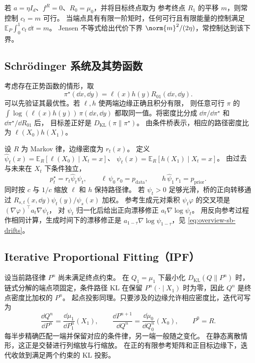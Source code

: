 \begin{example}
若 \(a=\eta I_d\)、\(f^R=0\)、\(R_0=\mu_0\)，并将目标终点取为
参考终点 \(R_1\) 的平移 \(m\)，则常控制 \(c_t=m\) 可行。
当端点具有有限一阶矩时，任何可行且有限能量的控制满足
\(\mathbb E_P\int_0^1c_t\,\dd t=m\)。
Jensen 不等式给出代价下界 \(\norm{m}^2/(2\eta)\)，常控制达到该下界。
\end{example}

\subsection{Schrödinger 系统及其势函数}

考虑存在正势函数的情形，取
\[
  \pi^\star(\dd x,\dd y)=\ell(x)h(y)R_{01}(\dd x,\dd y).
\]
可以先验证其最优性。若 \(\ell,h\) 使两端边缘正确且积分有限，
则任意可行 \(\pi\) 的
\(\int\log(\ell(x)h(y))\,\pi(\dd x,\dd y)\)
都取同一值。将密度比分成
\(\dd\pi/\dd\pi^\star\) 和 \(\dd\pi^\star/\dd R_{01}\) 后，
目标差正好是 \(D_{\mathrm{KL}}(\pi\|\pi^\star)\)。
由条件桥表示，相应的路径密度比为 \(\ell(X_0)h(X_1)\)。

设 \(R\) 为 Markov 律，边缘密度为 \(r_t(x)\)。
定义 \(\widehat\psi_t(x)=\mathbb E_R[\ell(X_0)\mid X_t=x]\)、
\(\psi_t(x)=\mathbb E_R[h(X_1)\mid X_t=x]\)。
由过去与未来在 \(X_t\) 下条件独立，
\begin{equation}
  p_t^\star=r_t\widehat\psi_t\psi_t,\qquad
  \ell\,\psi_0\,r_0=p_{\mathrm{data}},\qquad
  h\,\widehat\psi_1\,r_1=p_{\mathrm{prior}} .
  \label{eq:training-sb-system}
\end{equation}
同时按 \(c\) 与 \(1/c\) 缩放 \(\ell\) 和 \(h\) 保持路径律。
若 \(\psi_t>0\) 足够光滑，桥的正向转移通过
\(R_{s,t}(x,\dd y)\psi_t(y)/\psi_s(x)\) 加权。
参考生成元对乘积 \(\psi_t\varphi\) 的交叉项是
\((\nabla\varphi)^\top a_t\nabla\psi_t\)，
对 \(\psi_t\) 归一化后给出正向漂移修正 \(a_t\nabla\log\psi_t\)。
用反向参考过程作相同计算，生成时间下的漂移修正是
\(a_{1-\tau}\nabla\log\widehat\psi_{1-\tau}\)，见
\eqref{eq:overview-sb-drifts}。

\subsection{Iterative Proportional Fitting（IPF）}

设当前路径律 \(P^n\) 尚未满足终点约束。
在 \(Q_1=\mu_1\) 下最小化 \(D_{\mathrm{KL}}(Q\|P^n)\) 时，
链式分解的端点项固定，条件路径 KL 在保留 \(P^n(\cdot\mid X_1)\)
时为零，因此 \(Q^n\) 是终点密度比加权的 \(P^n\)。
起点投影同理。只要涉及的边缘允许相应密度比，迭代可写为
\begin{equation}
  \frac{\dd Q^n}{\dd P^n}=\frac{\dd\mu_1}{\dd P^n_1}(X_1),\qquad
  \frac{\dd P^{n+1}}{\dd Q^n}=\frac{\dd\mu_0}{\dd Q^n_0}(X_0),
  \qquad P^0=R.
  \label{eq:training-ipf}
\end{equation}
每半步精确匹配一端并保留对应的条件律，另一端一般随之变化。
在静态离散情形，这正是交替进行列缩放与行缩放。
在正的有限参考矩阵和正目标边缘下，迭代收敛到满足两个约束的 KL 投影。


